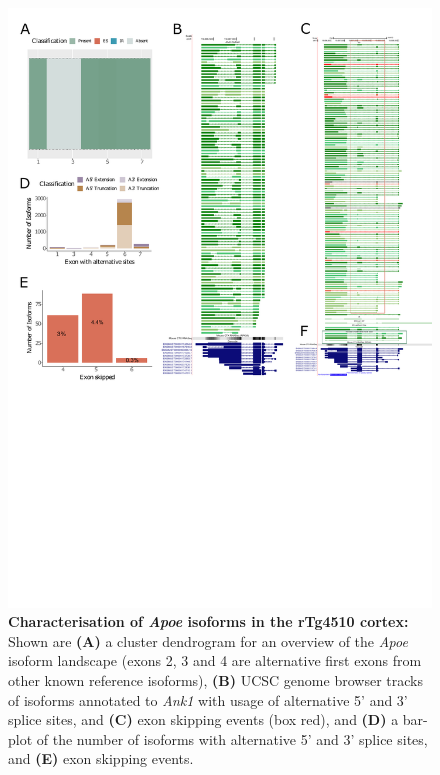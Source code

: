 \begin{figure}[htp]
	\centering
	\includegraphics[page=1,trim={0cm 11cm 0 0},scale = 0.85]{Figures/TargetGenes_Annotation_Portrait.pdf}
	\captionsetup{width=0.95\textwidth}
	\caption[Characterisation of \textit{Apoe} isoforms in the rTg4510 cortex]%
	{\textbf{Characterisation of \textit{Apoe} isoforms in the rTg4510 cortex:} Shown are \textbf{(A)} a cluster dendrogram for an overview of the \textit{Apoe} isoform landscape (exons 2, 3 and 4 are alternative first exons from other known reference isoforms), \textbf{(B)} UCSC genome browser tracks of isoforms annotated to \textit{Ank1} with usage of alternative 5' and 3' splice sites, and \textbf{(C)} exon skipping events (box red), and \textbf{(D)} a bar-plot of the number of isoforms with alternative 5' and 3' splice sites, and \textbf{(E)} exon skipping events.}    
	\label{fig:apoe}
\end{figure}

